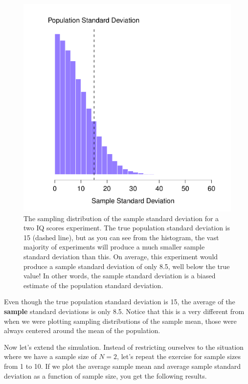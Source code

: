 \documentclass[]{book}
\begin{document}
\begin{figure}
\centering
\includegraphics{navarro_img/estimation/sampdistsd.pdf}
\caption{\label{fig:sampdistsd}The sampling distribution of the sample standard deviation for a two IQ scores experiment. The true population standard deviation is 15 (dashed line), but as you can see from the histogram, the vast majority of experiments will produce a much smaller sample standard deviation than this. On average, this experiment would produce a sample standard deviation of only 8.5, well below the true value! In other words, the sample standard deviation is a biased estimate of the population standard deviation.}
\end{figure}

Even though the true population standard deviation is 15, the average of the \textbf{sample} standard deviations is only 8.5. Notice that this is a very different from when we were plotting sampling distributions of the sample mean, those were always centered around the mean of the population.

Now let's extend the simulation. Instead of restricting ourselves to the situation where we have a sample size of \(N=2\), let's repeat the exercise for sample sizes from 1 to 10. If we plot the average sample mean and average sample standard deviation as a function of sample size, you get the following results.
\end{document}
